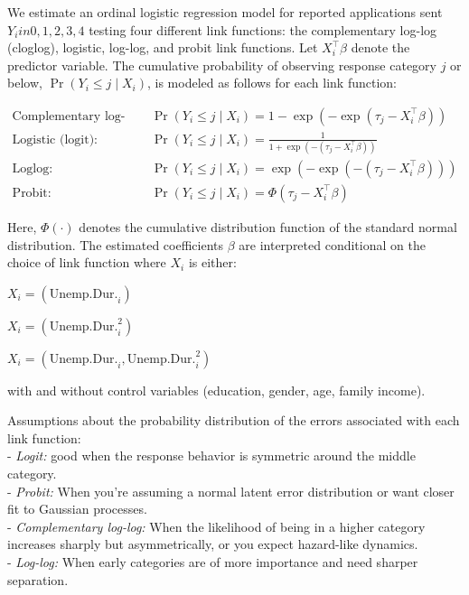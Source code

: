 \documentclass[
]{article}
\begin{document}
We estimate an ordinal logistic regression model for reported
applications sent \(Y_i in {0, 1, 2, 3, 4}\) testing four different link
functions: the complementary log-log (cloglog), logistic, log-log, and
probit link functions. Let \(X_i^\top \beta\) denote the predictor
variable. The cumulative probability of observing response category
\(j\) or below, \(\Pr(Y_i \leq j \mid X_i)\), is modeled as follows for
each link function:

\begin{align*}
\text{Complementary log-log (cloglog):} \quad & \Pr(Y_i \leq j \mid X_i) = 1 - \exp\left( -\exp\left( \tau_j - X_i^\top \beta \right) \right) \\
\text{Logistic (logit):} \quad & \Pr(Y_i \leq j \mid X_i) = \frac{1}{1 + \exp\left( -(\tau_j - X_i^\top \beta) \right)} \\
\text{Loglog:} \quad & \Pr(Y_i \leq j \mid X_i) = \exp\left( -\exp\left( -(\tau_j - X_i^\top \beta) \right) \right) \\
\text{Probit:} \quad & \Pr(Y_i \leq j \mid X_i) = \Phi(\tau_j - X_i^\top \beta)
\end{align*}

Here, \(\Phi(\cdot)\) denotes the cumulative distribution function of
the standard normal distribution. The estimated coefficients \(\beta\)
are interpreted conditional on the choice of link function where \(X_i\)
is either:

\(X_i = \left( \text{Unemp.Dur.}_i \right)\)

\(X_i = \left( \text{Unemp.Dur.}_i^2 \right)\)

\(X_i = \left( \text{Unemp.Dur.}_i, \text{Unemp.Dur.}_i^2 \right)\)

with and without control variables (education, gender, age, family
income).

Assumptions about the probability distribution of the errors associated
with each link function:\\
- \emph{Logit:} good when the response behavior is symmetric around the
middle category.\\
- \emph{Probit:} When you're assuming a normal latent error distribution
or want closer fit to Gaussian processes.\\
- \emph{Complementary log-log:} When the likelihood of being in a higher
category increases sharply but asymmetrically, or you expect hazard-like
dynamics.\\
- \emph{Log-log:} When early categories are of more importance and need
sharper separation.
\end{document}
